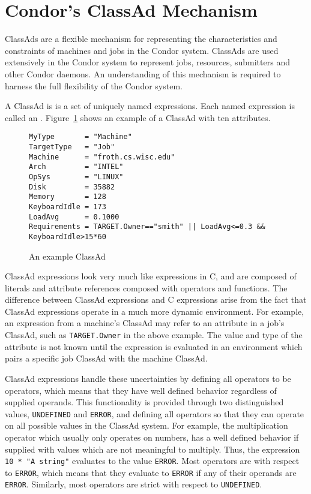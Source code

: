 \section{\label{sec:classad-reference}
Condor's ClassAd Mechanism}

ClassAds are a flexible mechanism for representing the characteristics and
constraints of machines and jobs in the Condor system.  ClassAds are used
extensively in the Condor system to represent jobs, resources, submitters
and other Condor daemons.  An understanding of this mechanism is required
to harness the full flexibility of the Condor system.

A ClassAd is is a set of uniquely named expressions.  Each named expression
is called an .  Figure~\ref{ClassAd:example} shows an example 
of a ClassAd with ten attributes.

\begin{figure}[hbt]
\footnotesize
\begin{verbatim}
MyType       = "Machine"
TargetType   = "Job"
Machine      = "froth.cs.wisc.edu"
Arch         = "INTEL"
OpSys        = "LINUX"
Disk         = 35882
Memory       = 128
KeyboardIdle = 173
LoadAvg      = 0.1000
Requirements = TARGET.Owner=="smith" || LoadAvg<=0.3 && KeyboardIdle>15*60
\end{verbatim}
\normalsize
\caption{\label{ClassAd:example}An example ClassAd}
\end{figure}

ClassAd expressions look very much like expressions in C, and are composed
of literals and attribute references composed with operators 
and functions.
The difference
between ClassAd expressions and C expressions arise from the fact that ClassAd
expressions operate in a much more dynamic environment.  For example, an
expression from a machine's ClassAd may refer to an attribute in a job's 
ClassAd, such as \verb+TARGET.Owner+ in the above example.  The value and type 
of the attribute is not known until the expression is evaluated in an 
environment which pairs a specific job ClassAd with the machine ClassAd.

ClassAd expressions handle these uncertainties by defining all operators
to be  operators, which means that they have well defined
behavior regardless of supplied operands.  This functionality is provided
through two distinguished values, \texttt{UNDEFINED} and \texttt{ERROR},
and defining all operators so that they can operate on all possible values
in the ClassAd system.  For example, the multiplication operator which usually
only operates on numbers, has a well defined behavior if supplied with values
which are not meaningful to multiply.  Thus, the expression 
\verb+10 * "A string"+ evaluates to the value \texttt{ERROR}.  Most operators
are  with respect to \texttt{ERROR}, which means that they evaluate
to \texttt{ERROR} if any of their operands are \texttt{ERROR}.  Similarly,
most operators are strict with respect to \texttt{UNDEFINED}.

